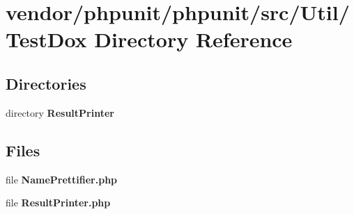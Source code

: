 \section{vendor/phpunit/phpunit/src/\+Util/\+Test\+Dox Directory Reference}
\label{dir_60194964cd6acf5e4cedbff0d588a45b}
\subsection*{Directories}
\begin{DoxyCompactItemize}
\item 
directory {\bf Result\+Printer}
\end{DoxyCompactItemize}
\subsection*{Files}
\begin{DoxyCompactItemize}
\item 
file {\bf Name\+Prettifier.\+php}
\item 
file {\bf Result\+Printer.\+php}
\end{DoxyCompactItemize}
